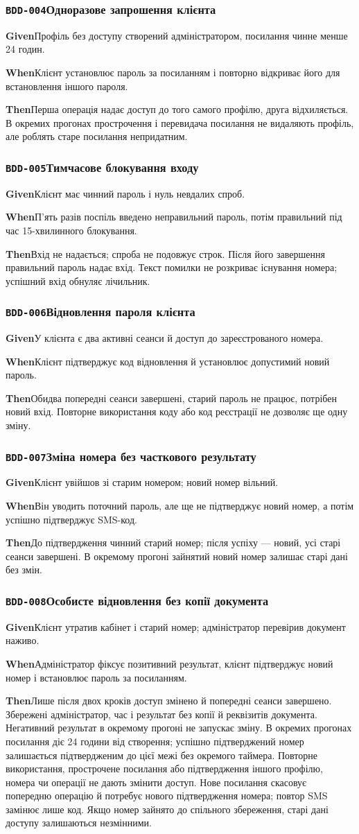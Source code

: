 \documentclass[11pt,a4paper]{article}
\newcommand{\scenario}[5]{%
  \Needspace{8\baselineskip}%
  \subsubsection*{\hypertarget{#1}{\texttt{#1}}\quad #2}%
  \textbf{Given}\quad #3\par
  \textbf{When}\quad #4\par
  \textbf{Then}\quad #5\par\medskip}
\begin{document}
\scenario{BDD-004}{Одноразове запрошення клієнта}{Профіль без доступу створений адміністратором, посилання чинне менше 24 годин.}{Клієнт установлює пароль за посиланням і повторно відкриває його для встановлення іншого пароля.}{Перша операція надає доступ до того самого профілю, друга відхиляється. В окремих прогонах прострочення і перевидача посилання не видаляють профіль, але роблять старе посилання непридатним.}

\scenario{BDD-005}{Тимчасове блокування входу}{Клієнт має чинний пароль і нуль невдалих спроб.}{П’ять разів поспіль введено неправильний пароль, потім правильний під час 15-хвилинного блокування.}{Вхід не надається; спроба не подовжує строк. Після його завершення правильний пароль надає вхід. Текст помилки не розкриває існування номера; успішний вхід обнуляє лічильник.}

\scenario{BDD-006}{Відновлення пароля клієнта}{У клієнта є два активні сеанси й доступ до зареєстрованого номера.}{Клієнт підтверджує код відновлення й установлює допустимий новий пароль.}{Обидва попередні сеанси завершені, старий пароль не працює, потрібен новий вхід. Повторне використання коду або код реєстрації не дозволяє ще одну зміну.}

\scenario{BDD-007}{Зміна номера без часткового результату}{Клієнт увійшов зі старим номером; новий номер вільний.}{Він уводить поточний пароль, але ще не підтверджує новий номер, а потім успішно підтверджує SMS-код.}{До підтвердження чинний старий номер; після успіху — новий, усі старі сеанси завершені. В окремому прогоні зайнятий новий номер залишає старі дані без змін.}

\scenario{BDD-008}{Особисте відновлення без копії документа}{Клієнт утратив кабінет і старий номер; адміністратор перевірив документ наживо.}{Адміністратор фіксує позитивний результат, клієнт підтверджує новий номер і встановлює пароль за посиланням.}{Лише після двох кроків доступ змінено й попередні сеанси завершено. Збережені адміністратор, час і результат без копії й реквізитів документа. Негативний результат в окремому прогоні не запускає зміну. В окремих прогонах посилання діє 24 години від створення; успішно підтверджений номер залишається підтвердженим до цієї межі без окремого таймера. Повторне використання, прострочене посилання або підтвердження іншого профілю, номера чи операції не дають змінити доступ. Нове посилання скасовує попередню операцію й потребує нового підтвердження номера; повтор SMS замінює лише код. Якщо номер зайнято до спільного збереження, старі дані доступу залишаються незмінними.}
\end{document}
